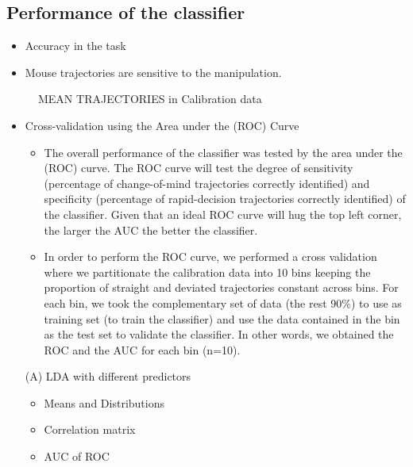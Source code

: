 \documentclass{article}
\begin{document}
\subsection{Performance of the classifier}

\begin{itemize}
\item Accuracy in the task
\item Mouse trajectories are sensitive to the manipulation. 
\end{itemize}

\begin{figure}
\caption{MEAN TRAJECTORIES in Calibration data}
\end{figure}


\begin{itemize}

\item Cross-validation using the Area under the (ROC) Curve

\begin{itemize}
\item The overall performance of the classifier was tested by the area under the (ROC) curve. The ROC curve will test the degree of sensitivity (percentage of change-of-mind trajectories correctly identified) and specificity (percentage of rapid-decision trajectories correctly identified) of the classifier. Given that an ideal ROC curve will hug the top left corner, the larger the AUC the better the classifier. 

\item In order to perform the ROC curve, we performed a cross validation where we partitionate the calibration data into 10 bins keeping the proportion of straight and deviated trajectories constant across bins. For each bin, we took the complementary set of data (the rest 90\%) to use as training set (to train the classifier) and use the data contained in the bin as the test set to validate the classifier. In other words, we obtained the ROC and the AUC for each bin (n=10). 
\end{itemize}

\item[(A)] LDA with different predictors

\begin{itemize}
\item Means and Distributions
\item Correlation matrix
\item AUC of ROC

\end{itemize}


\end{itemize}
\end{document}
